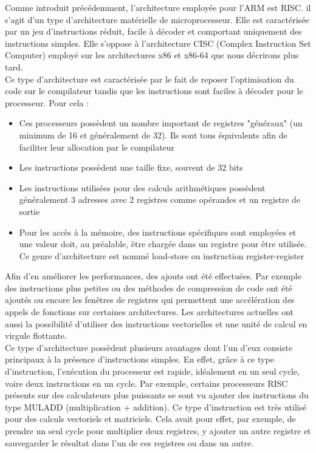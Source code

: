 Comme introduit précédemment, l'architecture employée pour l'ARM est RISC. il s'agit d'un type d'architecture matérielle de microprocesseur. Elle est caractérisée par un jeu d'instructions réduit, facile à décoder et comportant uniquement des instructions simples. Elle s'oppose à l'architecture CISC (Complex Instruction Set Computer) employé sur les architectures x86 et x86-64 que nous décrirons plus tard.
\\
Ce type d'architecture est caractérisée par le fait de reposer l'optimisation du code sur le compilateur tandis que les instructions sont faciles à décoder pour le processeur. Pour cela :
\begin{itemize}
\item Ces processeurs possèdent un nombre important de registres "généraux" (un minimum de 16 et généralement de 32). Ils sont tous équivalents afin de faciliter leur allocation par le compilateur
\item Les instructions possèdent une taille fixe, souvent de 32 bits
\item Les instructions utilisées pour des calculs arithmétiques possèdent généralement 3 adresses avec 2 registres comme opérandes et un registre de sortie
\item Pour les accès à la mémoire, des instructions spécifiques sont employées et une valeur doit, au préalable, être chargée dans un registre pour être utilisée. Ce genre d'architecture est nommé load-store ou instruction register-register
\end{itemize}
Afin d'en améliorer les performances, des ajouts ont été effectuées. Par exemple des instructions plus petites ou des méthodes de compression de code ont été ajoutés ou encore les fenêtres de registres qui permettent une accélération des appels de fonctions sur certaines architectures.
Les architectures actuelles ont aussi la possibilité d'utiliser des instructions vectorielles et une unité de calcul en virgule flottante. 
\\
Ce type d'architecture possèdent plusieurs avantages dont l'un d'eux consiste principaux à la présence d'instructions simples. En effet, grâce à ce type d'instruction, l'exécution du processeur est rapide, idéalement en un seul cycle, voire deux instructions en un cycle. Par exemple, certains processeurs RISC présents sur des calculateurs plus puissants se sont vu ajouter des instructions du type MULADD (multiplication + addition). Ce type d'instruction est très utilisé pour des calculs vectoriels et matriciels. Cela avait pour effet, par exemple, de prendre un seul cycle pour multiplier deux registres, y ajouter un autre registre et sauvegarder le résultat dans l'un de ces registres ou dans un autre.\\
